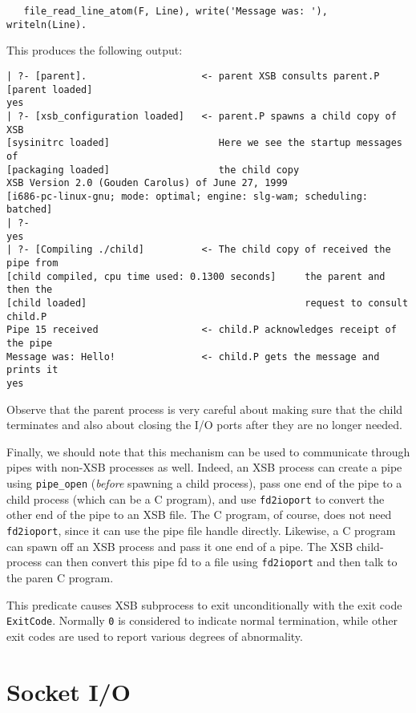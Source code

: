 \begin{description}
\begin{verbatim}
   file_read_line_atom(F, Line), write('Message was: '), writeln(Line).
    \end{verbatim}
    This produces the following output:
    \begin{verbatim}
| ?- [parent].                    <- parent XSB consults parent.P
[parent loaded]
yes
| ?- [xsb_configuration loaded]   <- parent.P spawns a child copy of XSB
[sysinitrc loaded]                   Here we see the startup messages of
[packaging loaded]                   the child copy
XSB Version 2.0 (Gouden Carolus) of June 27, 1999
[i686-pc-linux-gnu; mode: optimal; engine: slg-wam; scheduling: batched]
| ?- 
yes
| ?- [Compiling ./child]          <- The child copy of received the pipe from
[child compiled, cpu time used: 0.1300 seconds]     the parent and then the
[child loaded]                                      request to consult child.P
Pipe 15 received                  <- child.P acknowledges receipt of the pipe
Message was: Hello!               <- child.P gets the message and prints it
yes       
    \end{verbatim}
    
    Observe that the parent process is very careful about making sure that
    the child terminates and also about closing the I/O ports after they
    are no longer needed.
    
    Finally, we should note that this mechanism can be used to communicate
    through pipes with non-XSB processes as well. Indeed, an XSB process
    can create a pipe using {\tt pipe\_open} (\emph{before} spawning a
    child process), pass one end of the pipe to a child process (which can
    be a C program), and use {\tt fd2ioport} to convert the other end of
    the pipe to an XSB file. The C program, of course, does not need {\tt
      fd2ioport}, since it can use the pipe file handle directly. Likewise,
    a C program can spawn off an XSB process and pass it one end of a pipe.
    The XSB child-process can then convert this pipe fd to a file using
    {\tt fd2ioport} and then talk to the paren C program.

This predicate causes XSB subprocess to exit unconditionally with the exit
code {\tt ExitCode}. Normally {\tt 0} is considered to indicate normal
termination, while other exit codes are used to report various degrees of
abnormality.
\end{description}



\section{Socket I/O}

